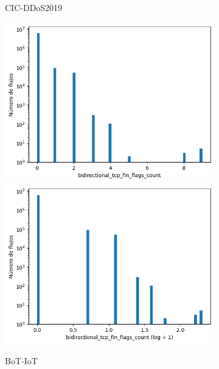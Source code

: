 \begin{figure}[H]
\begin{subfigure}[b]{0.32\textwidth}
        \caption{CIC-DDoS2019}
    \end{subfigure}
    \hfill
    \begin{subfigure}[b]{0.32\textwidth}
        \centering
        \includegraphics[width=\linewidth]{media/packet_pincer_botiot/bidirectional_tcp_fin_flags_count_linear_x_log_y.png}
        \includegraphics[width=\linewidth]{media/packet_pincer_botiot/bidirectional_tcp_fin_flags_count_log_x_log_y.png}
        \caption{BoT-IoT}
    \end{subfigure}
    \hfill
    \begin{subfigure}[b]{0.32\textwidth}
        \centering

\end{subfigure}
\end{figure}
